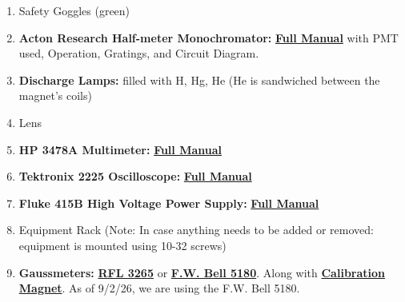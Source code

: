 \documentclass{../lab}
\begin{document}
\begin{enumerate}
    \item Safety Goggles (green)

    \item\textbf{Acton Research Half-meter Monochromator:}
    \href{https://drive.google.com/file/d/1qrGTtcw9cd7z8blat9n5xlo_y_Rtyrm6/view?usp=drive_link}{\textbf{Full Manual}} with PMT used, Operation, Gratings, and Circuit Diagram.

    \item\textbf{Discharge Lamps:} filled with H, Hg, He (He is sandwiched between the magnet's coils)

    \item Lens

    \item\textbf{HP 3478A Multimeter:}
    \href{https://drive.google.com/file/d/1vPMaIVZHGOhYulUXrpwIMa1T4b9p64RG/view?usp=drive_link}{\textbf{Full Manual}}

    \item\textbf{Tektronix 2225 Oscilloscope:}
    \href{https://drive.google.com/file/d/1kB34S8D27QtEMAu6vNm1ka8ySMbextKa/view?usp=drive_link}{\textbf{Full Manual}}

    \item\textbf{Fluke 415B High Voltage Power Supply:}
    \href{https://drive.google.com/file/d/1YGXOdHOTArg7Lzzgi99meF589KtqvYfO/view?usp=drive_link}{\textbf{Full Manual}}

    \item Equipment Rack (Note: In case anything needs to be added or removed: equipment is mounted using 10-32 screws)

    \item\textbf{Gaussmeters:}
    \href{https://drive.google.com/file/d/1UcyUobfZyvBW115cSbkhLa44kAZA_p2D/view?usp=drive_link}{\textbf{RFL 3265}} or \href{https://drive.google.com/file/d/1hIz7hW4KIF7obkdW_PdeqojFywvVudIo/view?usp=drive_link}{\textbf{F.W. Bell 5180}}. Along with \href{https://drive.google.com/file/d/1PWmq7gfHy88IoJdNyBXNS1SrU7H9JxL6/view?usp=drive_link}{\textbf{Calibration Magnet}}. As of 9/2/26, we are using the F.W. Bell 5180.




\end{enumerate}
\end{document}
